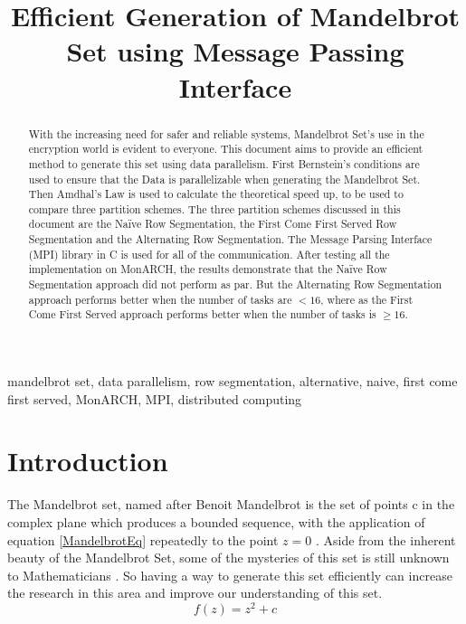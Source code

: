 \documentclass[conference]{IEEEtran}
\begin{document}
	
	\title{Efficient Generation of Mandelbrot Set using Message Passing Interface}
	
	\author{
		}
	\maketitle
	
	\begin{abstract}
		With the increasing need for safer and reliable systems, Mandelbrot Set's use in the encryption world is evident to everyone. This document aims to provide an efficient method to generate this set using data parallelism. First Bernstein's conditions \cite{bernstein1996analysis} are used to ensure that the Data is parallelizable when generating the Mandelbrot Set. Then Amdhal's Law is used \cite{amdahl1967validity} to calculate the theoretical speed up, to be used to compare three partition schemes. The three partition schemes discussed in this document are the Naïve Row Segmentation, the First Come First Served Row Segmentation and the Alternating Row Segmentation. The Message Parsing Interface (MPI) library in C \cite{openmpi} is used for all of the communication. After testing all the implementation on MonARCH, the results demonstrate that the Naïve Row Segmentation approach did not perform as par. But the Alternating Row Segmentation approach performs better when the number of tasks are $< 16$, where as the First Come First Served approach performs better when the number of tasks is $\ge 16$. 
	\end{abstract}

	
	\begin{IEEEkeywords}
		mandelbrot set, data parallelism, row segmentation, alternative, naive, first come first served, MonARCH, MPI, distributed computing
	\end{IEEEkeywords}
	
	\section{Introduction}

	The Mandelbrot set, named after Benoit Mandelbrot is the set of points c in the complex plane which produces a bounded sequence, with the application of equation \ref{MandelbrotEq} repeatedly to the point $z=0$ \cite{Mandelbrotset}. Aside from the inherent beauty of the Mandelbrot Set, some of the mysteries of this set is still unknown to Mathematicians \cite{lamb_2017}. So having a way to generate this set efficiently can increase the research in this area and improve our understanding of this set. 
	\begin{equation}
		f(z)=z^{2} + c \label{MandelbrotEq}
	\end{equation}
	
\end{document}

